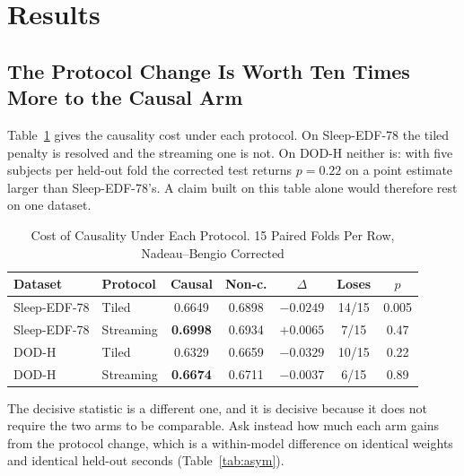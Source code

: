 \documentclass[conference]{IEEEtran}
\begin{document}
\section{Results}

\subsection{The Protocol Change Is Worth Ten Times More to the Causal Arm}

Table~\ref{tab:protocol} gives the causality cost under each protocol. On Sleep-EDF-78 the tiled
penalty is resolved and the streaming one is not. On DOD-H neither is: with five subjects per
held-out fold the corrected test returns $p = 0.22$ on a point estimate larger than
Sleep-EDF-78's. A claim built on this table alone would therefore rest on one dataset.

\begin{table}[t]
\caption{Cost of Causality Under Each Protocol. 15 Paired Folds Per Row, Nadeau--Bengio Corrected}
\label{tab:protocol}
\centering
\footnotesize
\setlength{\tabcolsep}{4pt}
\begin{tabular}{llccccc}
\toprule
Dataset & Protocol & Causal & Non-c. & $\Delta$ & Loses & $p$ \\
\midrule
Sleep-EDF-78 & Tiled     & 0.6649 & 0.6898 & $-0.0249$ & 14/15 & 0.005 \\
Sleep-EDF-78 & Streaming & \textbf{0.6998} & 0.6934 & $\mathbf{+0.0065}$ & 7/15 & 0.47 \\
\midrule
DOD-H        & Tiled     & 0.6329 & 0.6659 & $-0.0329$ & 10/15 & 0.22 \\
DOD-H        & Streaming & \textbf{0.6674} & 0.6711 & $\mathbf{-0.0037}$ & 6/15 & 0.89 \\
\bottomrule
\end{tabular}
\end{table}

The decisive statistic is a different one, and it is decisive because it does not require the two
arms to be comparable. Ask instead how much each arm gains from the protocol change, which is a
within-model difference on identical weights and identical held-out seconds
(Table~\ref{tab:asym}).
\end{document}
